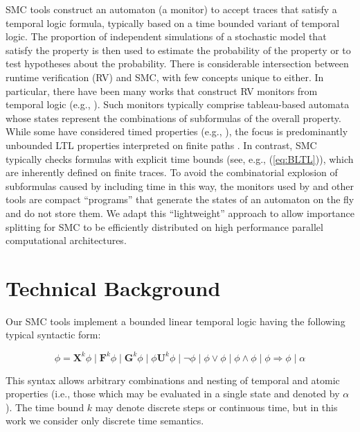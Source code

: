 \documentclass{llncs}
\begin{document}
SMC tools construct an automaton (a monitor) to accept traces that
satisfy a temporal logic formula, typically based on a time bounded
variant of temporal logic. The proportion of independent simulations
of a stochastic model that satisfy the property is then used to estimate
the probability of the property or to test hypotheses about the probability.
There is considerable intersection between runtime verification (RV)
and SMC, with few concepts unique to either. In particular, there
have been many works that construct RV monitors from temporal logic
(e.g., \cite{Geilen2001,GiannakopoulouHavelund2001,HavelundRosu2002,FinkbeinerSipma2004,BauerLeuckerSchallhart2006}).
Such monitors typically comprise tableau-based automata \cite{GerthPeledVardiWolper1995}
whose states represent the combinations of subformulas of the overall
property. While some have considered timed properties (e.g., \cite{BauerLeuckerSchallhart2006}),
the focus is predominantly unbounded LTL properties interpreted on
finite paths \cite{Eisner-et-al2003}. In contrast, SMC typically
checks formulas with explicit time bounds (see, e.g., (\ref{eq:BLTL})),
which are inherently defined on finite traces. To avoid the combinatorial
explosion of subformulas caused by including time in this way, the
monitors used by \cite{SedwardsJegourelLegay2012,BoyerCorreLegaySedwards2013}
and other tools are compact ``programs'' that generate the states
of an automaton on the fly and do not store them. We adapt this ``lightweight''
approach to allow importance splitting for SMC to be efficiently distributed
on high performance parallel computational architectures.


\section{Technical Background}

Our SMC tools \cite{SedwardsJegourelLegay2012,BoyerCorreLegaySedwards2013}
implement a bounded linear temporal logic having the following typical
syntactic form:

\begin{equation}
\phi=\mathbf{X}^{k}\phi\mid\mathbf{F}^{k}\phi\mid\mathbf{G}^{k}\phi\mid\phi\mathbf{U}^{k}\phi\mid\neg\phi\mid\phi\vee\phi\mid\phi\wedge\phi\mid\phi\Rightarrow\phi\mid\alpha\label{eq:BLTL}
\end{equation}


This syntax allows arbitrary combinations and nesting of temporal
and atomic properties (i.e., those which may be evaluated in a single
state and denoted by $\alpha$). The time bound $k$ may denote discrete
steps or continuous time, but in this work we consider only discrete
time semantics.
\end{document}
